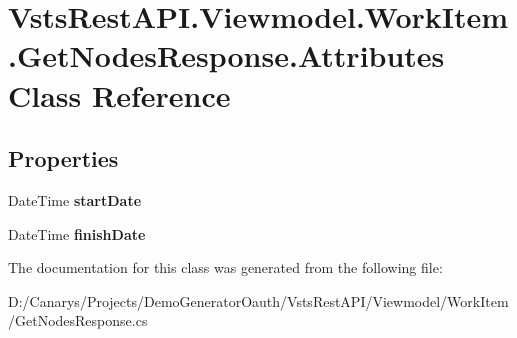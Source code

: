 \hypertarget{class_vsts_rest_a_p_i_1_1_viewmodel_1_1_work_item_1_1_get_nodes_response_1_1_attributes}{}\section{Vsts\+Rest\+A\+P\+I.\+Viewmodel.\+Work\+Item.\+Get\+Nodes\+Response.\+Attributes Class Reference}
\label{class_vsts_rest_a_p_i_1_1_viewmodel_1_1_work_item_1_1_get_nodes_response_1_1_attributes}
\subsection*{Properties}
\begin{DoxyCompactItemize}
\item 
\mbox{\label{class_vsts_rest_a_p_i_1_1_viewmodel_1_1_work_item_1_1_get_nodes_response_1_1_attributes_ac3bd426c7299a390731c5c6cb45a75b6}} 
Date\+Time {\bfseries start\+Date}
\item 
\mbox{\label{class_vsts_rest_a_p_i_1_1_viewmodel_1_1_work_item_1_1_get_nodes_response_1_1_attributes_ae607562b150f531e2eacf7a7fe71c339}} 
Date\+Time {\bfseries finish\+Date}
\end{DoxyCompactItemize}


The documentation for this class was generated from the following file\+:\begin{DoxyCompactItemize}
\item 
D\+:/\+Canarys/\+Projects/\+Demo\+Generator\+Oauth/\+Vsts\+Rest\+A\+P\+I/\+Viewmodel/\+Work\+Item/Get\+Nodes\+Response.\+cs\end{DoxyCompactItemize}
